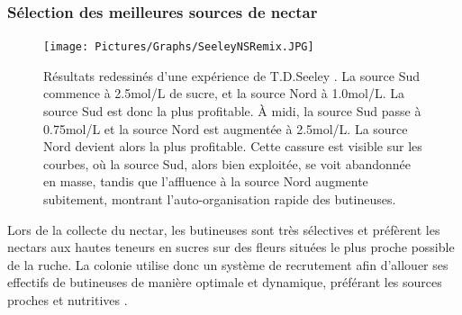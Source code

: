 			\subsubsection{Sélection des meilleures sources de nectar}
			
			\begin{figure}
			\centering
			\texttt{[image: Pictures/Graphs/SeeleyNSRemix.JPG]}
				\caption{Résultats redessinés d'une expérience de T.D.Seeley \cite{seeley_collective_1991}. La source Sud
commence à 2.5mol/L de sucre, et la source Nord à 1.0mol/L. La source Sud est
donc la plus profitable. À midi, la source Sud
passe à 0.75mol/L et la source Nord est augmentée à 2.5mol/L. La source Nord devient alors la plus profitable.
Cette cassure est visible sur les courbes, où la source Sud, alors bien exploitée, se voit abandonnée en masse, tandis que l’affluence à la source Nord augmente subitement, montrant l’auto-organisation rapide des butineuses.}
			\label{SeeleyNS}
			\end{figure}
			
			
			Lors de la collecte du nectar, les butineuses sont très sélectives et préfèrent les nectars aux hautes teneurs en sucres sur des fleurs situées le plus proche possible de la ruche. La colonie utilise donc un système de recrutement afin d'allouer ses effectifs de butineuses de manière optimale et dynamique, préférant les sources proches et nutritives \cite{riviere_modemulti-agent_2021}.
			
